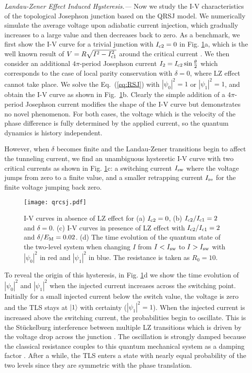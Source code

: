\documentclass[aps,prl,twocolumn,showpacs,showpacs,10pt,superscriptaddress]{revtex4-1}
\begin{document}
{\it Landau-Zener Effect Induced Hysteresis.---}
Now we study the I-V characteristics of the topological Josephson junction based on the QRSJ model. We numerically simulate the average voltage upon adiabatic current injection, which gradually increases to a large value and then decreases back to zero.
As a benchmark, we first show the I-V curve for a trivial junction with $I_{\rm c2} = 0$ in Fig. \ref{fig:qrcsj}a, which is the well known result of $V= R \sqrt{ I^2 - I^2_{\rm c1}}$ around the critical current \cite{tinkhambook}. We then consider an additional $4\pi$-period Josephson current $I_2=I_{\rm c2}\sin \frac{\theta}{2}$ which corresponds to the case of local parity conservation with $\delta = 0$, where LZ effect cannot take place. We solve the Eq.~(\ref{eq:RSJ}) with $|\psi_0|^2=1$ or $|\psi_1|^2=1$, and obtain the I-V curve as shown in Fig.~\ref{fig:qrcsj}b. Clearly the simple addition of a $4\pi$-period Josephson current modifies the shape of the I-V curve but demonstrates no novel phenomenon. For both cases, the voltage which is the velocity of the phase difference is fully determined by the applied current, so the quantum dynamics is history independent. 

However, when $\delta$ becomes finite and the Landau-Zener transitions begin to affect the tunneling current, we find an unambiguous hysteretic I-V curve with two critical currents as shown in Fig. \ref{fig:qrcsj}c: a switching current $I_{\rm sw}$ where the voltage jumps from zero to a finite value, and a smaller retrapping current $I_{\rm re}$ for the finite voltage jumping back zero.


\begin{figure}[t]
\begin{center}
\texttt{[image: qrcsj.pdf]}
\caption{I-V curves in absence of LZ effect for (a) $I_{\rm c2} = 0$, (b) $I_{\rm c2}/I_{\rm c1} = 2$ and $\delta=0$. (c) I-V curves in presence of LZ effect with $I_{\rm c2}/I_{\rm c1} = 2$ and $\delta/E_{\rm M} = 0.02$. (d) The time evolution of the quantum state of the two-level system when changing $I$ from $I<I_{\rm sw}$ to $I>I_{\rm sw}$ with $|\psi_0|^2$ in red and $|\psi_1|^2$ in blue. The resistance is taken as $R_0 = 10$.}
\label{fig:qrcsj}
\end{center}
\end{figure}

To reveal the origin of this hysteresis, in Fig. \ref{fig:qrcsj}d we show the time evolution of $|\psi_0|^2$ and $|\psi_1|^2$ when the injected current increases across the switching point. Initially for a small injected current below the switch value, the voltage is zero and the TLS stays at $|1\rangle$ with certainty ($|\psi_1|^2=1$). When the injected current is increased above the switching current, the probabilities begin to oscillate. This is the St\"{u}ckelburg interference between multiple LZ transitions which is driven by the voltage drop across the junction \cite{LZ,noripr}. The oscillation is strongly damped because the classical resistance couples to this quantum mechanical system as a damping factor \cite{tinkhambook}. After a while, the TLS enters a state with nearly equal probability of the two levels since they are symmetric with the phase translation.
\end{document}
